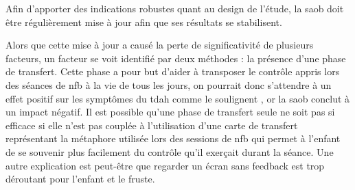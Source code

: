 
Afin d'apporter des indications robustes quant au design de l'étude, la \gls{saob} doit être régulièrement mise à jour afin que ses résultats se stabilisent. 





Alors que cette mise à jour a causé la perte de significativité de plusieurs facteurs, un facteur se voit identifié par deux méthodes : la présence d'une phase de transfert. 
Cette phase a pour but d'aider à transposer le contrôle appris lors des séances de \gls{nfb} à la vie de tous les jours, on pourrait donc s'attendre à un effet positif sur les symptômes
du \gls{tdah} comme le soulignent \citet{Arns2014, Strehl2006, Gani2008}, or la \gls{saob} conclut à un impact négatif. Il est possible qu'une phase de transfert seule ne soit pas si efficace
si elle n'est pas couplée à l'utilisation d'une carte de transfert représentant la métaphore utilisée lors des sessions de \gls{nfb} qui permet à l'enfant de se souvenir plus facilement du contrôle
qu'il exerçait durant la séance. Une autre explication est peut-être que regarder un écran sans feedback est trop déroutant pour l'enfant et le fruste. 




 